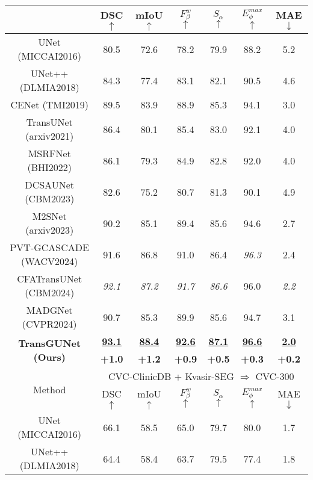 \begin{table}[h]
\begin{tabular}{c|cccccc}
    & DSC \scriptsize{$\uparrow$} & mIoU \scriptsize{$\uparrow$} & $F_{\beta}^{w}$ \scriptsize{$\uparrow$}  & $S_{\alpha}$ \scriptsize{$\uparrow$} & $E_{\phi}^{max}$ \scriptsize{$\uparrow$} & MAE \scriptsize{$\downarrow$} \\
    \hline
     UNet \tiny{(MICCAI2016)}       & 80.5 & 72.6 & 78.2 & 79.9 & 88.2 & 5.2 \\
     UNet++ \tiny{(DLMIA2018)}      & 84.3 & 77.4 & 83.1 & 82.1 & 90.5 & 4.6 \\
     CENet \tiny{(TMI2019)}         & 89.5 & 83.9 & 88.9 & 85.3 & 94.1 & 3.0 \\
     TransUNet \tiny{(arxiv2021)}   & 86.4 & 80.1 & 85.4 & 83.0 & 92.1 & 4.0 \\
     MSRFNet \tiny{(BHI2022)}       & 86.1 & 79.3 & 84.9 & 82.8 & 92.0 & 4.0 \\
     DCSAUNet \tiny{(CBM2023)}      & 82.6 & 75.2 & 80.7 & 81.3 & 90.1 & 4.9 \\
     M2SNet \tiny{(arxiv2023)}      & 90.2 & 85.1 & 89.4 & 85.6 & 94.6 & 2.7 \\
     PVT-GCASCADE \tiny{(WACV2024)} & 91.6 & 86.8 & 91.0 & 86.4 & \textit{96.3} & 2.4 \\
     CFATransUNet \tiny{(CBM2024)}  & \textit{92.1} & \textit{87.2} & \textit{91.7} & \textit{86.6} & 96.0 & \textit{2.2} \\
     MADGNet \tiny{(CVPR2024)}      & 90.7 & 85.3 & 89.9 & 85.6 & 94.7 & 3.1 \\
     \hline
     \multicolumn{1}{c|}{\multirow{2}{*}{\textbf{TransGUNet \tiny{(Ours)}}}}     & \textbf{\underline{93.1}} & \textbf{\underline{88.4}} & \textbf{\underline{92.6}} & \textbf{\underline{87.1}} & \textbf{\underline{96.6}} & \textbf{\underline{2.0}} \\ \cline{2-7}
     & \textbf{+1.0} & \textbf{+1.2} & \textbf{+0.9} & \textbf{+0.5} & \textbf{+0.3} & \textbf{+0.2} \\
    \hline
    \multicolumn{1}{c|}{\multirow{2}{*}{Method}} & \multicolumn{6}{c}{CVC-ClinicDB + Kvasir-SEG $\Rightarrow$ CVC-300} \\ \cline{2-7}
    & DSC \scriptsize{$\uparrow$} & mIoU \scriptsize{$\uparrow$} & $F_{\beta}^{w}$ \scriptsize{$\uparrow$}  & $S_{\alpha}$ \scriptsize{$\uparrow$} & $E_{\phi}^{max}$ \scriptsize{$\uparrow$} & MAE \scriptsize{$\downarrow$} \\
    \hline
     UNet \tiny{(MICCAI2016)}       & 66.1 & 58.5 & 65.0 & 79.7 & 80.0 & 1.7 \\
     UNet++ \tiny{(DLMIA2018)}      & 64.4 & 58.4 & 63.7 & 79.5 & 77.4 & 1.8 \\

\end{tabular}
\end{table}
